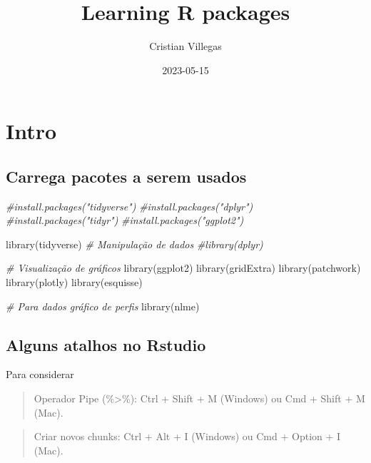 \documentclass[
]{book}
\title{Learning R packages}
\author{Cristian Villegas}
\date{2023-05-15}
\newenvironment{Shaded}{\begin{snugshade}}{\end{snugshade}}
\newcommand{\CommentTok}[1]{\textcolor[rgb]{0.56,0.35,0.01}{\textit{#1}}}
\newcommand{\FunctionTok}[1]{\textcolor[rgb]{0.00,0.00,0.00}{#1}}
\newcommand{\NormalTok}[1]{#1}
\begin{document}
\maketitle

{
\setcounter{tocdepth}{1}
\tableofcontents
}
\hypertarget{intro}{%
\chapter{Intro}\label{intro}}

\hypertarget{carrega-pacotes-a-serem-usados}{%
\section{Carrega pacotes a serem usados}\label{carrega-pacotes-a-serem-usados}}

\begin{Shaded}
\begin{Highlighting}[]
\CommentTok{\#install.packages("tidyverse") }
\CommentTok{\#install.packages("dplyr")     }
\CommentTok{\#install.packages("tidyr")     }
\CommentTok{\#install.packages("ggplot2")   }

\FunctionTok{library}\NormalTok{(tidyverse)}
\CommentTok{\# Manipulação de dados}
\CommentTok{\#library(dplyr)}

\CommentTok{\# Visualização de gráficos}
\FunctionTok{library}\NormalTok{(ggplot2)}
\FunctionTok{library}\NormalTok{(gridExtra)}
\FunctionTok{library}\NormalTok{(patchwork)}
\FunctionTok{library}\NormalTok{(plotly)}
\FunctionTok{library}\NormalTok{(esquisse)}

\CommentTok{\# Para dados gráfico de perfis}
\FunctionTok{library}\NormalTok{(nlme)}
\end{Highlighting}
\end{Shaded}

\hypertarget{alguns-atalhos-no-rstudio}{%
\section{Alguns atalhos no Rstudio}\label{alguns-atalhos-no-rstudio}}

Para considerar

\begin{quote}
Operador Pipe (\%\textgreater\%): Ctrl + Shift + M (Windows) ou Cmd + Shift + M (Mac).
\end{quote}

\begin{quote}
Criar novos chunks: Ctrl + Alt + I (Windows) ou Cmd + Option + I (Mac).
\end{quote}
\end{document}
